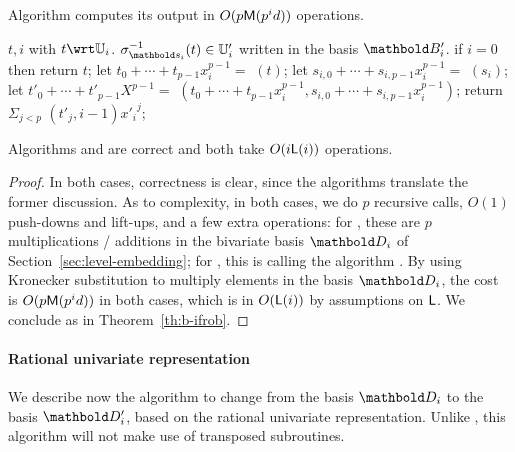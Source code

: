 \begin{lemma}
  \label{th:rur-s}
  Algorithm  computes its output in
  $O(p\mathsf{M}(p^id))$ operations.
\end{lemma}

\begin{algorithm}
  \caption{} 
  \label{alg:applyinverse}
  \begin{algorithmic}[1]
    \REQUIRE $t,i$ with $t \wrt \U_i$.
    \ENSURE $\sigma_{\lst{s}_i}^{-1}(t)\in \U'_i$ written in the basis $\basis{B}'_i$.
    \STATE if $i=0$ then return $t$;
    \STATE let $t_0 + \cdots + t_{p-1}x_i^{p-1} =$ $(t)$;
    \STATE let $s_{i,0}+\cdots+s_{i,p-1}x_i^{p-1}=$ $(s_i)$;
    \STATE let $t'_0 + \cdots + t'_{p-1}X^{p-1} =$ $(t_0 + \cdots + t_{p-1}x_i^{p-1}, s_{i,0}+\cdots+s_{i,p-1}x_i^{p-1})$;
  \STATE return $\Sigma_{j < p}$ $(t'_j, i-1) {x'_i}^j$;
\end{algorithmic}
\end{algorithm}

\begin{proposition}\label{Prop:apply}
  Algorithms  and
   are correct and both take $O(i\mathsf{L}(i))$
  operations.
\end{proposition}
\begin{proof}
  In both cases, correctness is clear, since the algorithms translate
  the former discussion. As to complexity, in both cases, we do $p$
  recursive calls, $O(1)$ push-downs and lift-ups, and a few extra
  operations: for , these are $p$
  multiplications / additions in the bivariate basis $\basis{D}_i$ of
  Section~\ref{sec:level-embedding}; for ,
  this is calling the algorithm .  By using
  Kronecker substitution to multiply elements in the basis
  $\basis{D}_i$, the cost is $O(p\mathsf{M}(p^id))$ in both cases, which is
  in $O(\mathsf{L}(i))$ by assumptions on $\mathsf{L}$. We conclude as in
  Theorem~\ref{th:b-ifrob}.
\end{proof}


\paragraph{Rational univariate representation}
We describe now the algorithm to change from the basis $\basis{D}_i$
to the basis $\basis{D}_i'$, based on the rational univariate
representation. Unlike , this algorithm will not make use
of transposed subroutines.

